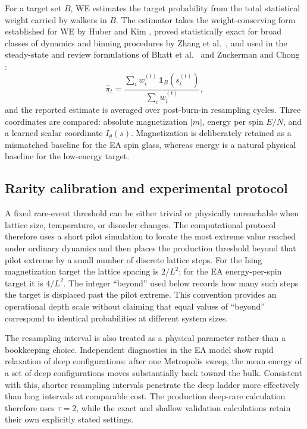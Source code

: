 \documentclass[a4paper,fleqn]{cas-sc}
\begin{document}
For a target set $B$, WE estimates the target probability from the total statistical weight
carried by walkers in $B$. The estimator takes the weight-conserving form established for WE
by Huber and Kim \citep{huber1996}, proved statistically exact for broad classes of dynamics
and binning procedures by Zhang et al.\ \citep{zhang2010}, and used in the steady-state and
review formulations of Bhatt et al.\ \citep{bhatt2010} and Zuckerman and Chong
\citep{zuckerman2017}:
\begin{equation}
\hat\pi_t=\frac{\sum_i w_i^{(t)}\,\mathbf 1_B\!\left(s_i^{(t)}\right)}{\sum_i w_i^{(t)}},
\label{eq:weest}
\end{equation}
and the reported estimate is averaged over post-burn-in resampling cycles. Three coordinates
are compared: absolute magnetization $|m|$, energy per spin $E/N$, and a learned scalar
coordinate $I_\theta(s)$. Magnetization is deliberately retained as a mismatched baseline for
the EA spin glass, whereas energy is a natural physical baseline for the low-energy target.

\subsection{Rarity calibration and experimental protocol}\label{sec:calib}
A fixed rare-event threshold can be either trivial or physically unreachable when lattice
size, temperature, or disorder changes. The computational protocol therefore uses a short
pilot simulation to locate the most extreme value reached under ordinary dynamics and then
places the production threshold beyond that pilot extreme by a small number of discrete
lattice steps. For the Ising magnetization target the lattice spacing is $2/L^2$; for the EA
energy-per-spin target it is $4/L^2$. The integer ``beyond'' used below records how many such
steps the target is displaced past the pilot extreme. This convention provides an operational
depth scale without claiming that equal values of ``beyond'' correspond to identical
probabilities at different system sizes.

The resampling interval is also treated as a physical parameter rather than a bookkeeping
choice. Independent diagnostics in the EA model show rapid relaxation of deep configurations:
after one Metropolis sweep, the mean energy of a set of deep configurations moves
substantially back toward the bulk. Consistent with this, shorter resampling intervals
penetrate the deep ladder more effectively than long intervals at comparable cost. The
production deep-rare calculation therefore uses $\tau=2$, while the exact and shallow
validation calculations retain their own explicitly stated settings.
\end{document}

